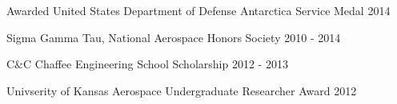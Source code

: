 
\begin{cvhonors}

  \cvhonor
    {} %
    {Awarded United States Department of Defense Antarctica Service Medal} %
    {} %
    {2014} %

  \cvhonor
    {} %
    {Sigma Gamma Tau, National Aerospace Honors Society} %
    {} %
    {2010 - 2014} %

  \cvhonor
    {} %
    {C\&C Chaffee Engineering School Scholarship} %
    {} %
    {2012 - 2013} %

  \cvhonor
    {} %
    {Univserity of Kansas Aerospace Undergraduate Researcher Award} %
    {} %
    {2012} %

\end{cvhonors}

